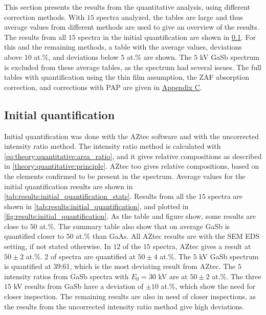 This section presents the results from the quantitative analysis, using different correction methods.
With $15$ spectra analyzed, the tables are large and thus average values from different methods are used to give an overview of the results.
The results from all $15$ spectra in the initial quantification are shown in \cref{results:initial_quantification}.
For this and the remaining methods, a table with the average values, deviations above $10$ at.\%, and deviations below $5$ at.\% are shown.
The $5$ kV GaSb spectrum is excluded from these average tables, as the spectrum had several issues.
The full tables with quantification using the thin film assumption, the ZAF absorption correction, and corrections with PAP are given in \hyperref[appendix:tables]{Appendix C}.


\subsection{Initial quantification}
\label{results:initial_quantification}

Initial quantification was done with the AZtec software and with the uncorrected intensity ratio method.
The intensity ratio method is calculated with \cref{eq:theory:quantitative:area_ratio}, and it gives relative compositions as described in \cref{theory:quantitative:principle}.
AZtec too gives relative compositions, based on the elements confirmed to be present in the spectrum.
Average values for the initial quantification results are shown in \cref{tab:results:initial_quantification_stats}.
Results from all the $15$ spectra are shown in \cref{tab:results:initial_quantification}, and plotted in \cref{fig:results:initial_quantification}.
As the table and figure show, some results are close to $50$ at.\%.
The summary table also show that on average GaSb is quantified closer to $50$ at.\% than GaAs.
All AZtec results are with the SEM EDS setting, if not stated otherwise.
In $12$ of the $15$ spectra, AZtec gives a result at $50\pm2$ at.\%.
$2$ of spectra are quantified at $50\pm4$ at.\%.
The $5$ kV GaSb spectrum is quantified at 39:61, which is the most deviating result from AZtec.
The $5$ intensity ratios from GaSb spectra with $E_0 = 30$ kV are at $50\pm2$ at.\%.
The three $15$ kV results from GaSb have a deviation of $\pm10$ at.\%, which show the need for closer inspection.
The remaining results are also in need of closer inspections, as the results from the uncorrected intensity ratio method give high deviations.


